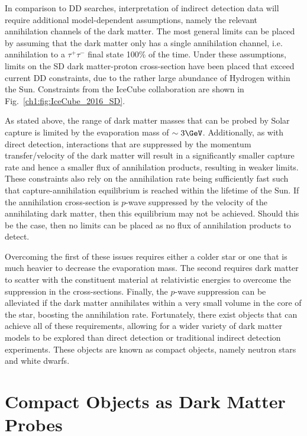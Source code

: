 In comparison to DD searches, interpretation of indirect detection data will require additional model-dependent assumptions, namely the relevant annihilation channels of the dark matter. 
The most general limits can be placed by assuming that the dark matter only has a single annihilation channel, i.e. annihilation to a $\tau^+\tau^-$ final state 100\% of the time. 
Under these assumptions, limits on the SD dark matter-proton cross-section have been placed that exceed current DD constraints, due to the rather large abundance of Hydrogen within the Sun. Constraints from the IceCube collaboration are shown in Fig.~\ref{ch1:fig:IceCube_2016_SD}.

As stated above, the range of dark matter masses that can be probed by Solar capture is limited by the evaporation mass of $\sim 3\GeV$. Additionally, as with direct detection, interactions that are suppressed by the momentum transfer/velocity of the dark matter will result in a significantly smaller capture rate and hence a smaller flux of annihilation products, resulting in weaker limits. These constraints also rely on the annihilation rate being sufficiently fast such that capture-annihilation equilibrium is reached within the lifetime of the Sun. If the annihilation cross-section is $p$-wave suppressed by the velocity of the annihilating dark matter, then this equilibrium may not be achieved. Should this be the case, then no limits can be placed as no flux of annihilation products to detect. 

Overcoming the first of these issues requires either a colder star or one that is much heavier to decrease the evaporation mass. The second requires dark matter to scatter with the constituent material at relativistic energies to overcome the suppression in the cross-sections. Finally, the $p$-wave suppression can be alleviated if the dark matter annihilates within a very small volume in the core of the star, boosting the annihilation rate.
Fortunately, there exist objects that can achieve all of these requirements, allowing for a wider variety of dark matter models to be explored than direct detection or traditional indirect detection experiments. These objects are known as compact objects, namely neutron stars and white dwarfs.

\section{Compact Objects as Dark Matter Probes}

